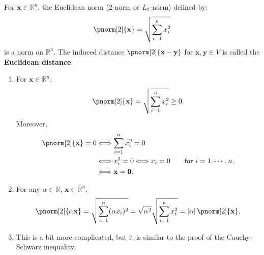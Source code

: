 \documentclass{huhtakm-template-book-v2}
\begin{document}
    \begin{eg}
        For $\mathbf{x} \in \mathbb{R}^{n}$, the Euclidean norm ($2$-norm or $L_{2}$-norm) defined by:
        \begin{equation*}
            \pnorm[2]{\mathbf{x}} = \sqrt{\sum_{i=1}^{n}x_{i}^{2}}
        \end{equation*}
        is a norm on $\mathbb{R}^{n}$. The induced distance $\pnorm[2]{\mathbf{x} - \mathbf{y}}$ for $\mathbf{x}, \mathbf{y} \in V$ is called the \textbf{Euclidean distance}.
    \end{eg}
    \begin{proofing}
        \begin{enumerate}
            \item For $\mathbf{x} \in \mathbb{R}^{n}$,
            \begin{equation*}
                \pnorm[2]{\mathbf{x}} = \sqrt{\sum_{i=1}^{n}x_{i}^{2}} \geq 0.
            \end{equation*}
            Moreover,
            \begin{align*}
                \pnorm[2]{\mathbf{x}} = 0 &\Longleftrightarrow \sum_{i=1}^{n}x_{i}^{2} = 0\\
                &\Longleftrightarrow x_{i}^{2} = 0 \Longleftrightarrow x_{i} = 0 \qquad \text{for } i = 1, \cdots, n,\\
                &\Longleftrightarrow \mathbf{x} = \mathbf{0}.
            \end{align*}
            \item For any $\alpha \in \mathbb{R}$, $\mathbf{x} \in \mathbb{R}^{n}$,
            \begin{equation*}
                \pnorm[2]{\alpha \mathbf{x}} = \sqrt{\sum_{i=1}^{n}(\alpha x_{i})^{2}} = \sqrt{\alpha^{2}} \sqrt{\sum_{i=1}^{n}x_{i}^{2}} = \abs{\alpha} \pnorm[2]{\mathbf{x}}.
            \end{equation*}
            \item This is a bit more complicated, but it is similar to the proof of the Cauchy-Schwarz inequality. 
            

\end{enumerate}
\end{proofing}
\end{document}
